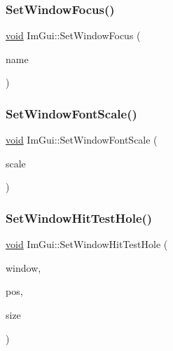 \mbox{\label{namespaceImGui_aa612adbb975051090898f094a1608f24}} 
\subsubsection{\texorpdfstring{Set\+Window\+Focus()}{SetWindowFocus()}\hspace{0.1cm}{\footnotesize\ttfamily [2/2]}}
{\footnotesize\ttfamily \hyperlink{imgui__impl__opengl3__loader_8h_ac668e7cffd9e2e9cfee428b9b2f34fa7}{void} Im\+Gui\+::\+Set\+Window\+Focus (\begin{DoxyParamCaption}\item[{const char $\ast$}]{name }\end{DoxyParamCaption})}

\mbox{\label{namespaceImGui_a11f2f343dbc9b00ccd9e99ebd59cfe8b}} 
\subsubsection{\texorpdfstring{Set\+Window\+Font\+Scale()}{SetWindowFontScale()}}
{\footnotesize\ttfamily \hyperlink{imgui__impl__opengl3__loader_8h_ac668e7cffd9e2e9cfee428b9b2f34fa7}{void} Im\+Gui\+::\+Set\+Window\+Font\+Scale (\begin{DoxyParamCaption}\item[{float}]{scale }\end{DoxyParamCaption})}

\mbox{\label{namespaceImGui_a83c0b24b73d8c9842de6ef882e394974}} 
\subsubsection{\texorpdfstring{Set\+Window\+Hit\+Test\+Hole()}{SetWindowHitTestHole()}}
{\footnotesize\ttfamily \hyperlink{imgui__impl__opengl3__loader_8h_ac668e7cffd9e2e9cfee428b9b2f34fa7}{void} Im\+Gui\+::\+Set\+Window\+Hit\+Test\+Hole (\begin{DoxyParamCaption}\item[{\hyperlink{structImGuiWindow}{Im\+Gui\+Window} $\ast$}]{window,  }\item[{const \hyperlink{structImVec2}{Im\+Vec2} \&}]{pos,  }\item[{const \hyperlink{structImVec2}{Im\+Vec2} \&}]{size }\end{DoxyParamCaption})}

